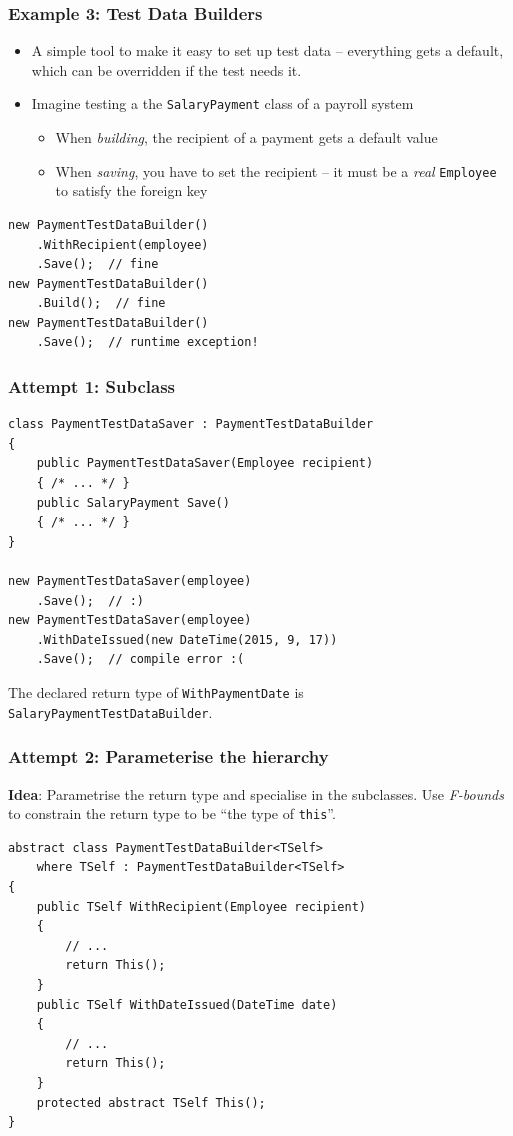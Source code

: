 \documentclass{beamer}
\begin{document}
  \begin{frame}[fragile]
    \frametitle{Example 3: Test Data Builders}
    \begin{itemize}
      \item A simple tool to make it easy to set up test data -- everything gets a default, which can be overridden if the test needs it.
      \item Imagine testing a the \texttt{SalaryPayment} class of a payroll system
      \begin{itemize}
        \item When \emph{building}, the recipient of a payment gets a default value
        \item When \emph{saving}, you have to set the recipient -- it must be a \emph{real} \texttt{Employee} to satisfy the foreign key
      \end{itemize}
    \end{itemize}
        
    \begin{verbatim}
new PaymentTestDataBuilder()
    .WithRecipient(employee)
    .Save();  // fine
new PaymentTestDataBuilder()
    .Build();  // fine
new PaymentTestDataBuilder()
    .Save();  // runtime exception!
    \end{verbatim}
\end{frame}

  \begin{frame}[fragile]
    \frametitle{Attempt 1: Subclass}
    \begin{verbatim}
class PaymentTestDataSaver : PaymentTestDataBuilder
{
    public PaymentTestDataSaver(Employee recipient)
    { /* ... */ }
    public SalaryPayment Save()
    { /* ... */ }
}

new PaymentTestDataSaver(employee)
    .Save();  // :)
new PaymentTestDataSaver(employee)
    .WithDateIssued(new DateTime(2015, 9, 17))
    .Save();  // compile error :(
    \end{verbatim}
    
    The declared return type of \texttt{WithPaymentDate} is \texttt{SalaryPaymentTestDataBuilder}.
\end{frame}

  \begin{frame}[fragile]
    \frametitle{Attempt 2: Parameterise the hierarchy}
    \textbf{Idea}: Parametrise the return type and specialise in the subclasses.
    Use \emph{F-bounds} to constrain the return type to be ``the type of \texttt{this}''.
    \begin{verbatim}
abstract class PaymentTestDataBuilder<TSelf>
    where TSelf : PaymentTestDataBuilder<TSelf>
{
    public TSelf WithRecipient(Employee recipient)
    {
        // ...
        return This();
    }
    public TSelf WithDateIssued(DateTime date)
    {
        // ...
        return This();
    }
    protected abstract TSelf This();
}
    \end{verbatim}
\end{frame}
\end{document}

